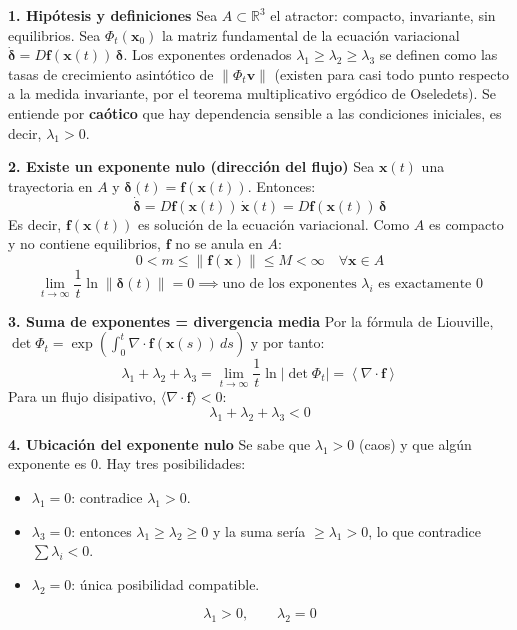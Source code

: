 \documentclass[11pt,a4paper]{article}
\newenvironment{solucion}[1][Solución Detallada]{%
    \vspace{1.5mm}%
    \noindent{\large\textbf{Solución:}}\par\vspace{1.5mm}%
}{%
    \par\vspace{3mm}%
}
\begin{document}
\begin{solucion}

\textbf{\large 1. Hipótesis y definiciones}
Sea $A \subset \mathbb{R}^3$ el atractor: compacto, invariante, sin equilibrios. Sea $\Phi_t(\mathbf{x}_0)$ la matriz fundamental de la ecuación variacional $\dot{\boldsymbol\delta} = D\mathbf{f}(\mathbf{x}(t))\,\boldsymbol\delta$. Los exponentes ordenados $\lambda_1 \ge \lambda_2 \ge \lambda_3$ se definen como las tasas de crecimiento asintótico de $\|\Phi_t \mathbf{v}\|$ (existen para casi todo punto respecto a la medida invariante, por el teorema multiplicativo ergódico de Oseledets). Se entiende por \textbf{caótico} que hay dependencia sensible a las condiciones iniciales, es decir, $\lambda_1 > 0$.

\vspace{3.5mm}

\textbf{\large 2. Existe un exponente nulo (dirección del flujo)}
Sea $\mathbf{x}(t)$ una trayectoria en $A$ y $\boldsymbol\delta(t) = \mathbf{f}(\mathbf{x}(t))$. Entonces:
\[
\dot{\boldsymbol\delta} = D\mathbf{f}(\mathbf{x}(t))\,\dot{\mathbf{x}}(t) = D\mathbf{f}(\mathbf{x}(t))\,\boldsymbol\delta
\]
Es decir, $\mathbf{f}(\mathbf{x}(t))$ es solución de la ecuación variacional. Como $A$ es compacto y no contiene equilibrios, $\mathbf{f}$ no se anula en $A$:
\[
0 < m \le \|\mathbf{f}(\mathbf{x})\| \le M < \infty \quad \forall \mathbf{x} \in A
\]
\[
\lim_{t \to \infty} \frac{1}{t}\ln\|\boldsymbol\delta(t)\| = 0 \implies \boxed{\text{uno de los exponentes } \lambda_i \text{ es exactamente } 0}
\]

\vspace{3.5mm}

\textbf{\large 3. Suma de exponentes = divergencia media}
Por la fórmula de Liouville, $\det \Phi_t = \exp\left(\int_0^t \nabla\cdot\mathbf{f}(\mathbf{x}(s))\,ds\right)$ y por tanto:
\[
\lambda_1 + \lambda_2 + \lambda_3 = \lim_{t\to\infty}\frac{1}{t}\ln|\det\Phi_t| = \left\langle \nabla \cdot \mathbf{f} \right\rangle
\]
Para un flujo disipativo, $\langle\nabla\cdot\mathbf{f}\rangle < 0$:
\[
\boxed{\lambda_1 + \lambda_2 + \lambda_3 < 0}
\]

\vspace{3.5mm}

\textbf{\large 4. Ubicación del exponente nulo}
Se sabe que $\lambda_1 > 0$ (caos) y que algún exponente es $0$. Hay tres posibilidades:
\begin{itemize}[leftmargin=2em]
    \item $\lambda_1 = 0$: contradice $\lambda_1 > 0$.
    \item $\lambda_3 = 0$: entonces $\lambda_1 \ge \lambda_2 \ge 0$ y la suma sería $\ge \lambda_1 > 0$, lo que contradice $\sum\lambda_i < 0$.
    \item $\lambda_2 = 0$: única posibilidad compatible.
\end{itemize}
\[
\boxed{\lambda_1 > 0, \qquad \lambda_2 = 0}
\]


\end{solucion}
\end{document}
